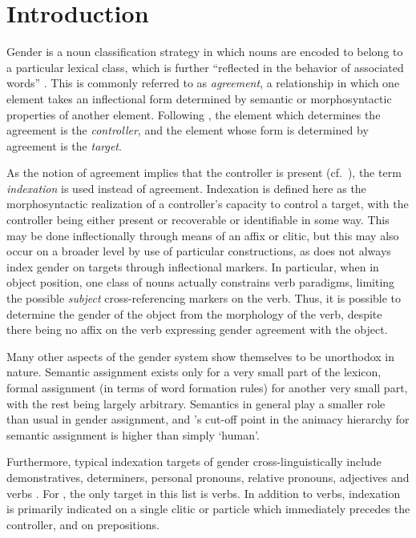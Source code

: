 \documentclass[output=collectionpaper,hidelinks]{langscibook}
\theoremstyle{remark}
\begin{document}
\section{Introduction}
\label{sec:Introduction}


Gender is a noun classification strategy in which nouns are encoded to belong to
a particular lexical class, which is further ``reflected in the behavior of
associated words'' \citep[231]{Hockett1958}. This is commonly referred to as
\emph{agreement}, a relationship in which one element takes an inflectional form
determined by semantic or morphosyntactic properties of another element.
Following \cite{Corbett2006}, the element which determines the agreement is the
\emph{controller}, and the element whose form is determined by agreement is the
\emph{target}.

As the notion of agreement implies that the controller is present (cf.\
\citealt{Corbett2006}), the term \emph{indexation} is used instead of agreement.
Indexation is defined here as the morphosyntactic realization of a controller's
capacity to control a target, with the controller being either present or
recoverable or identifiable in some way.  This may be done inflectionally
through means of an affix or clitic, but this may also occur on a broader level
by use of particular constructions, as \ili{Uduk} does not always index gender on
targets through inflectional markers.  In particular, when in object position,
one class of nouns actually constrains verb paradigms, limiting the possible
\emph{subject} cross-referencing markers on the verb. Thus, it is possible to determine the gender of the object from the morphology of the verb, despite there being no affix on the verb expressing gender agreement with the object.

Many other aspects of the  gender system show themselves to be unorthodox in
nature. Semantic assignment exists only for a very small part of the lexicon,
formal assignment (in terms of word formation rules) for another very small
part, with the rest being largely arbitrary. Semantics in general play a smaller
role than usual in gender assignment, and \ili{Uduk}'s cut-off point in the animacy
hierarchy for semantic assignment is higher than simply `human'.

Furthermore, typical indexation targets of gender cross-linguistically include
demonstratives, determiners, personal pronouns, relative pronouns, adjectives and
verbs \citep{DiGarbo2014}. For \ili{Uduk}, the only target in this list is verbs. In addition to verbs, indexation is primarily indicated on a single clitic or particle which immediately precedes the controller, and on prepositions.
\end{document}
